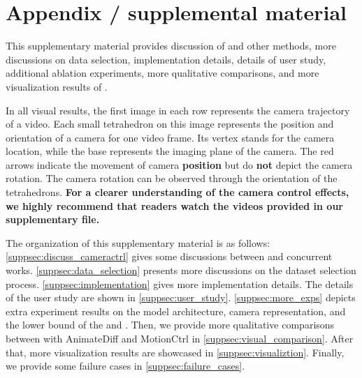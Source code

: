 \appendix
\section{Appendix / supplemental material}

\noindent This supplementary material provides discussion of \method and other methods, more discussions on data selection, implementation details, details of user study, additional ablation experiments, more qualitative comparisons, and more visualization results of \method. 

In all visual results, the first image in each row represents the camera trajectory of a video. 
%
Each small tetrahedron on this image represents the position and orientation of a camera for one video frame.
%
Its vertex stands for the camera location, while the base represents the imaging plane of the camera.
%
The red arrows indicate the movement of camera \textbf{position} but do \textbf{not} depict the camera rotation.
%
The camera rotation can be observed through the orientation of the tetrahedrons. \textbf{For a clearer understanding of the camera control effects, we highly recommend that readers watch the videos provided in our supplementary file.} 

The organization of this supplementary material is as follows: \cref{suppsec:discuss_cameractrl} gives some discussions between \method and concurrent works.
%
\cref{suppsec:data_selection} presents more discussions on the dataset selection process.
%
\cref{suppsec:implementation} gives more implementation details.
%
The details of the user study are shown in \cref{suppsec:user_study}.
%
\cref{suppsec:more_exps} depicts extra experiment results on the model architecture, camera representation, and the lower bound of the \rote and \te.
%
Then, we provide more qualitative comparisons between \method with AnimateDiff and MotionCtrl in \cref{suppsec:visual_comparison}. 
%
After that, more visualization results are showcased in \cref{suppsec:visualiztion}.
%
Finally, we provide some failure cases in \cref{suppsec:failure_cases}.

